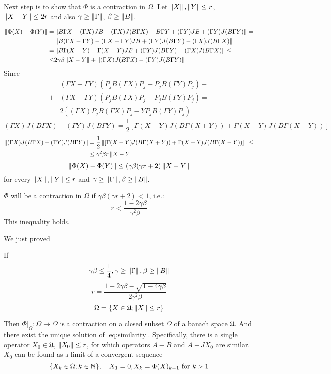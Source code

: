 \documentclass{article}
\begin{document}
Next step is to show that $\Phi$ is a contraction in $\Omega$.
Let $\left\|{X}\right\|, \left\|{Y}\right\| \leq r$, $\left\|{X+Y}\right\| \leq 2r$ and also $\gamma\geq\left\|{\Gamma}\right\|$, $\beta\geq\left\|{B}\right\|$.

\begin{align*}
    \left\|{\Phi(X) - \Phi(Y)}\right\|
    =& \left\|{B\Gamma X - (\Gamma X)JB - (\Gamma X)J(B\Gamma X) - B\Gamma Y + (\Gamma Y)JB + (\Gamma Y)J(B\Gamma Y)}\right\| = \\
    =& \left\|{B(\Gamma X - \Gamma Y) - (\Gamma X - \Gamma Y) JB + (\Gamma Y) J(B\Gamma Y) - (\Gamma X)J(B\Gamma X)}\right\| = \\
    =& \left\|{B\Gamma(X-Y) - \Gamma(X-Y)JB + (\Gamma Y) J(B\Gamma Y) - (\Gamma X)J(B\Gamma X)}\right\| \leq \\
    \leq& 2\gamma\beta\left\|{X-Y}\right\| + \left\|{(\Gamma X)J(B\Gamma X) - (\Gamma Y) J(B\Gamma Y)}\right\|
\end{align*}
Since 
\begin{align*}
    &(\Gamma X - \Gamma Y)(P_jB(\Gamma X)P_j + P_jB(\Gamma Y)P_j) + \\
    + &(\Gamma X + \Gamma Y)(P_jB(\Gamma X)P_j - P_jB(\Gamma Y)P_j) = \\
= &2((\Gamma X)P_jB(\Gamma X)P_j- YP_jB(\Gamma Y)P_j)\end{align*}
$$(\Gamma X)J(B\Gamma X) - (\Gamma Y) J(B\Gamma Y)
= \frac12\left[\Gamma(X-Y)J(B\Gamma(X+Y)) + \Gamma(X+Y)J(B\Gamma(X-Y))\right]$$
\begin{align*}
    \left\|{(\Gamma X)J(B\Gamma X) - (\Gamma Y) J(B\Gamma Y)}\right\|
    &= \frac12\left\|{\left[\Gamma(X-Y)J(B\Gamma(X+Y)) + \Gamma(X+Y)J(B\Gamma(X-Y))\right]}\right\|\leq \\
    &\leq \gamma^2\beta r \left\|{X-Y}\right\|
\end{align*}
$$\left\|{\Phi(X) - \Phi(Y)}\right\| \leq (\gamma\beta(\gamma r + 2)\left\|{X-Y}\right\|$$
for every $\left\|{X}\right\|, \left\|{Y}\right\| \leq r$ and $\gamma\geq\left\|{\Gamma}\right\|, \beta\geq\left\|{B}\right\|$.

$\Phi$ will be a contraction in $\Omega$ if $\gamma\beta(\gamma r + 2) < 1$, i.e.:
$$r < \frac{1-2\gamma\beta}{\gamma^2\beta}$$
This inequality holds.

We just proved
\begin{thm}
    If
    $$\gamma\beta\leq\frac14, \gamma\geq\left\|{\Gamma}\right\|, \beta\geq\left\|{B}\right\|$$
    $$r = \frac{1 - 2\gamma\beta - \sqrt{1-4\gamma\beta}}{2 \gamma^2 \beta}$$
    $$\Omega = \{ X\in\mathfrak U; \left\|{X}\right\| \leq r \}$$

    Then
    $\Phi|_{\Omega}:\Omega\to\Omega$ is a contraction on a closed subset $\Omega$ of a banach space $\mathfrak U$.
    And there exist the unique solution of \eqref{eq:similarity}.
    Specifically, there is a single operator $X_0\in\mathfrak U$, $\left\|{X_0}\right\| \leq r$,
    for which operators $A-B$ and $A-JX_0$ are similar.
    $X_0$ can be found as a limit of a convergent sequence
    $$\{X_k\in\Omega; k\in\mathbb{N}\}, \quad X_1 = 0, X_k = \Phi(X)_{k-1} \text{ for } k>1$$
\end{thm}
\end{document}

